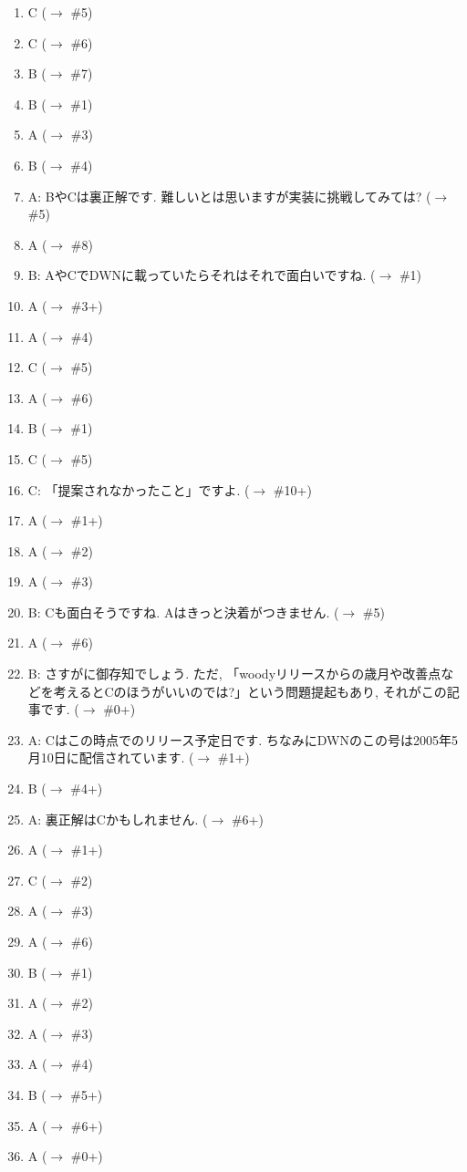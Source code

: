 \documentclass[mingoth,a4paper]{jsarticle}
\begin{document}
\begin{enumerate}
 \item C ($\to$ \#5)
 \item C ($\to$ \#6)
 \item B ($\to$ \#7)
 \item B ($\to$ \#1)
 \item A ($\to$ \#3)
 \item B ($\to$ \#4)
 \item A: BやCは裏正解です. 難しいとは思いますが実装に挑戦してみては? ($\to$ \#5)
 \item A ($\to$ \#8)
 \item B: AやCでDWNに載っていたらそれはそれで面白いですね. ($\to$ \#1)
 \item A ($\to$ \#3+)
 \item A ($\to$ \#4)
 \item C ($\to$ \#5)
 \item A ($\to$ \#6)
 \item B ($\to$ \#1)
 \item C ($\to$ \#5)
 \item C: 「提案されなかったこと」ですよ. ($\to$ \#10+)
 \item A ($\to$ \#1+)
 \item A ($\to$ \#2)
 \item A ($\to$ \#3)
 \item B: Cも面白そうですね. Aはきっと決着がつきません. ($\to$ \#5)
 \item A ($\to$ \#6)
 \item B: さすがに御存知でしょう. ただ, 「woodyリリースからの歳月や改善点などを考えるとCのほうがいいのでは?」という問題提起もあり, それがこの記事です. ($\to$ \#0+)
 \item A: Cはこの時点でのリリース予定日です. ちなみにDWNのこの号は2005年5月10日に配信されています. ($\to$ \#1+)
 \item B ($\to$ \#4+)
 \item A: 裏正解はCかもしれません. ($\to$ \#6+)
 \item A ($\to$ \#1+)
 \item C ($\to$ \#2)
 \item A ($\to$ \#3)
 \item A ($\to$ \#6)
 \item B ($\to$ \#1)
 \item A ($\to$ \#2)
 \item A ($\to$ \#3)
 \item A ($\to$ \#4)
 \item B ($\to$ \#5+)
 \item A ($\to$ \#6+)
 \item A ($\to$ \#0+)

\end{enumerate}
\end{document}
